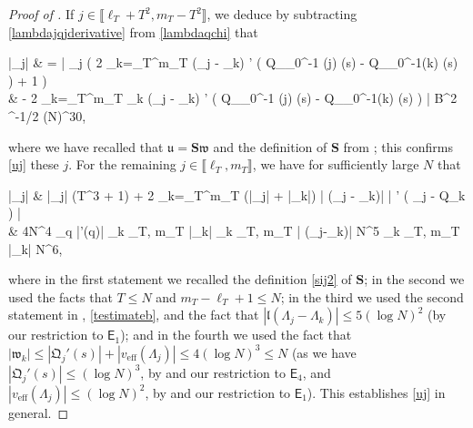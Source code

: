 \documentclass{amsart}
\numberwithin{equation}{section}
\DeclareMathOperator{\eff}{eff}
\theoremstyle{remark}
\theoremstyle{definition}
\begin{document}
\begin{proof}[Proof of ]
		If $j \in \llbracket \ell_T + T^2, m_T - T^2 \rrbracket$, we deduce by subtracting \eqref{lambdajqjderivative} from \eqref{lambdaqchi} that
		\begin{flalign*}
			|_j| & = \Bigg|  _j \cdot \bigg( 2 \displaystyle\sum_{k=\ell_T}^{m_T}  (\Lambda_j - \Lambda_k) \cdot \chi' \big( Q_{\varphi_0^{-1} (j)} (s) - Q_{\varphi_0^{-1}(k)} (s) \big) + 1 \bigg) \\
			& \qquad \qquad - 2 \displaystyle\sum_{k=\ell_T}^{m_T} _k \cdot {} (\Lambda_j - \Lambda_k) \cdot \chi' \big( Q_{\varphi_0^{-1} (j)} (s) - Q_{\varphi_0^{-1}(k)} (s) \big) \Bigg| \le B^2 ^{-1/2} (\log N)^{30},
		\end{flalign*}
		
		\noindent where we have recalled that $\bm{\mathfrak{u}} = \bm{S} \bm{\mathfrak{w}}$ and the definition of $\bm{S}$ from ; this confirms \eqref{uj} these $j$. For the remaining $j \in \llbracket \ell_T, m_T \rrbracket$, we have for sufficiently large $N$ that 
		\begin{flalign*}
			|_j| & \le |_j| \cdot (T^3 + 1) +  2 \displaystyle\sum_{k=\ell_T}^{m_T} (|_j| + |_k|) \cdot | (\Lambda_j - \Lambda_k)| \cdot | \chi' ( _j - Q_k  ) | \\
			& \le  4N^4 \cdot \displaystyle\sup_{q \in {}} |\chi'(q)| \cdot \displaystyle\max_{k \in \llbracket \ell_T, m_T \rrbracket} |_k| \cdot \displaystyle\max_{k \in \llbracket \ell_T, m_T \rrbracket} | (\Lambda_j-\Lambda_k)| \le N^5 \cdot \displaystyle\max_{k \in \llbracket \ell_T, m_T \rrbracket} |_k| \le N^6,
		\end{flalign*}
		
		\noindent where in the first statement we recalled the definition \eqref{sij2} of $\bm{S}$; in the second we used the facts that $T \le N$ and $m_T - \ell_T + 1 \le N$; in the third we used the second statement in , \eqref{testimateb}, and the fact that $|\mathfrak{l} (\Lambda_j-\Lambda_k)| \le 5 (\log N)^2$ (by our restriction to $\mathsf{E}_1$); and in the fourth we used the fact that $|\mathfrak{w}_k| \le |\mathfrak{Q}_j' (s)| + |v_{\eff} (\Lambda_j)| \le 4 (\log N)^3 \le N$ (as we have $|\mathfrak{Q}_j' (s)| \le (\log N)^3$, by  and our restriction to $\mathsf{E}_4$, and $|v_{\eff} (\Lambda_j)| \le (\log N)^2$, by  and our restriction to $\mathsf{E}_1$). This establishes \eqref{uj} in general.
		

\end{proof}
\end{document}
